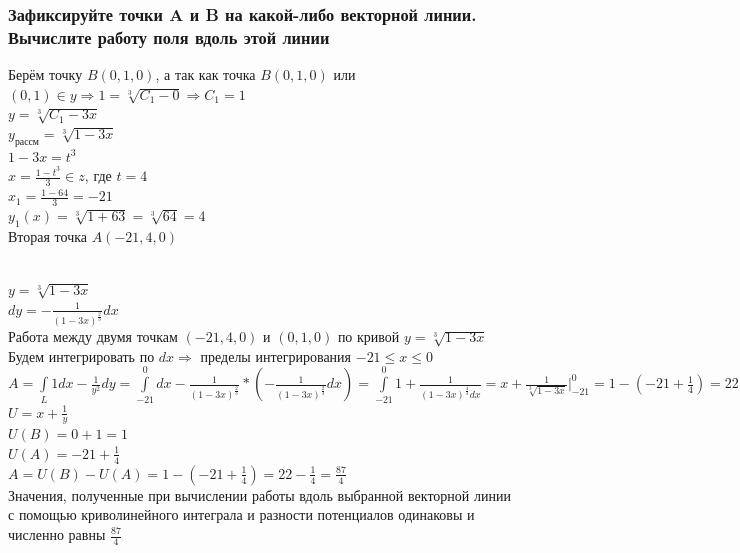 \documentclass{article}
\begin{document}
                \subsubsection{Зафиксируйте точки A и B на какой-либо векторной линии. Вычислите работу поля вдоль этой линии}
                Берём точку $B(0, 1, 0)$, а так как точка $B(0, 1, 0)$ или $(0, 1) \in y \Rightarrow 1 = \sqrt[3]{C_1 - 0} \Rightarrow C_1 = 1$\\
                $y = \sqrt[3]{C_1 - 3x}$\\
                $y_{рассм} = \sqrt[3]{1 - 3x}$\\
                $1 - 3x = t^3$\\
                $x = \frac{1 - t^3}{3} \in z$, где $t = 4$\\
                $x_1 = \frac{1-64}{3} = -21$\\
                $y_1(x) = \sqrt[3]{1+63} = \sqrt[3]{64} = 4$\\
                Вторая точка $A(-21, 4, 0)$\\
                \begin{figure}[h!]
                \end{figure}\\
                $y = \sqrt[3]{1 - 3x}$\\
                $dy = -\frac{1}{(1 - 3x)^{\frac{2}{3}}}dx$\\
                Работа между двумя точкам $(-21, 4, 0)$ и $(0, 1, 0)$ по кривой $y = \sqrt[3]{1 - 3x}$\\
                Будем интегрировать по $dx \Rightarrow$ пределы интегрирования $-21 \le x \le 0$\\
                $A = \int\limits_L{1dx} - \frac{1}{y^2}dy = \int\limits^0_{-21}{dx} - \frac{1}{(1 - 3x)^{\frac{2}{3}}} * (-\frac{1}{(1 - 3x)^{\frac{2}{3}}}dx) = \int\limits^0_{-21}{1 + \frac{1}{(1-3x)^{\frac{4}{3}}dx}} = x + \frac{1}{\sqrt[3]{1 - 3x}} |^0_{-21} = 1 - (-21 + \frac{1}{4}) = 22 - \frac{1}{4} = \frac{87}{4}$\\
                $U = x + \frac{1}{y}$\\
                $U(B) = 0 + 1 = 1$\\
                $U(A) = -21 + \frac{1}{4}$\\
                $A = U(B) - U(A) = 1 - (-21 + \frac{1}{4}) = 22 - \frac{1}{4} = \frac{87}{4}$\\
                Значения, полученные при вычислении работы вдоль выбранной векторной линии с помощью криволинейного интеграла и разности потенциалов одинаковы и численно равны $\frac{87}{4}$
\end{document}
